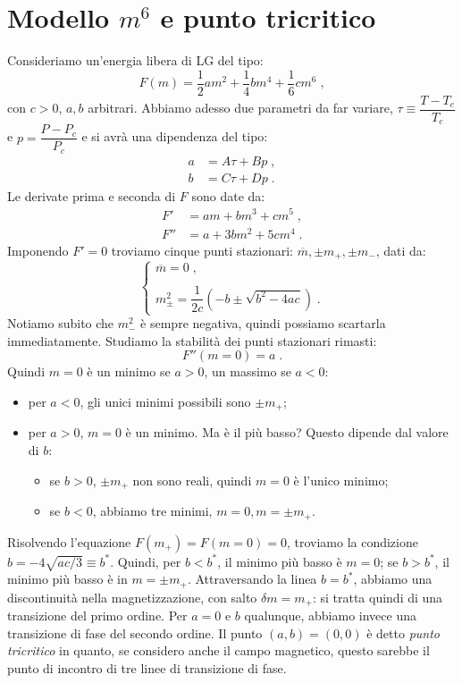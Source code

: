 \documentclass[10pt,a4paper]{report}
\theoremstyle{definition}
\numberwithin{equation}{section}
\begin{document}
\section{Modello $m^6$ e punto tricritico}
Consideriamo un'energia libera di LG del tipo:
\begin{equation}
F(m)=\frac{1}{2}am^2+\frac{1}{4}bm^4+\frac{1}{6}cm^6\;,
\end{equation}
con $c>0$, $a,b$ arbitrari. Abbiamo adesso due parametri da far variare, $\tau\equiv\dfrac{T-T_c}{T_c}$ e $p=\dfrac{P-P_c}{P_c}$ e si avrà una dipendenza del tipo:
\begin{align*}
a &= A\tau+Bp\;, \\
b &= C\tau+Dp\;.
\end{align*}
Le derivate prima e seconda di $F$ sono date da:
\begin{align}
F' &= am+bm^3+cm^5\;, \\
F'' &= a+3bm^2+5cm^4\;.
\end{align}
Imponendo $F'=0$ troviamo cinque punti stazionari: $\overline{m},\pm m_+,\pm m_-$, dati da:
\begin{equation}
\begin{cases}
\overline{m}=0\;, \\
\\
m_{\pm}^2=\dfrac{1}{2c}(-b\pm \sqrt{b^2-4ac})\;.
\end{cases}
\end{equation}
Notiamo subito che $m_-^2$ è sempre negativa, quindi possiamo scartarla immediatamente. Studiamo la stabilità dei punti stazionari rimasti:
\begin{equation}
F''(m=0)=a\;.
\end{equation}
Quindi $m=0$ è un minimo se $a>0$, un massimo se $a<0$:
\begin{itemize}
\item per $a<0$, gli unici minimi possibili sono $\pm m_+$;
\item per $a>0$, $m=0$ è un minimo. Ma è il più basso? Questo dipende dal valore di $b$:
\begin{itemize}
\item se $b>0$, $\pm m_+$ non sono reali, quindi $m=0$ è l'unico minimo;
\item se $b<0$, abbiamo tre minimi, $m=0,m=\pm m_+$.
\end{itemize}
\end{itemize}
Risolvendo l'equazione $F(m_+)=F(m=0)=0$, troviamo la condizione $b=-4\sqrt{ac/3}\equiv b^*$. Quindi, per $b<b^*$, il minimo più basso è $m=0$; se $b>b^*$, il minimo più basso è in $m=\pm m_+$. Attraversando la linea $b=b^*$, abbiamo una discontinuità nella magnetizzazione, con salto $\delta m=m_+$: si tratta quindi di una transizione del primo ordine. Per $a=0$ e $b$ qualunque, abbiamo invece una transizione di fase del secondo ordine. Il punto $(a,b)=(0,0)$ è detto \emph{punto tricritico} in quanto, se considero anche il campo magnetico, questo sarebbe il punto di incontro di tre linee di transizione di fase.
\end{document}
